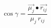 \documentclass[12pt]{article}
\begin{document}
$$
   \cos\gamma = \frac{\vec{\mu_j}\bullet\vec{r_{ij}}}{\mu_j\,r_{ij}}
$$
\end{document}
